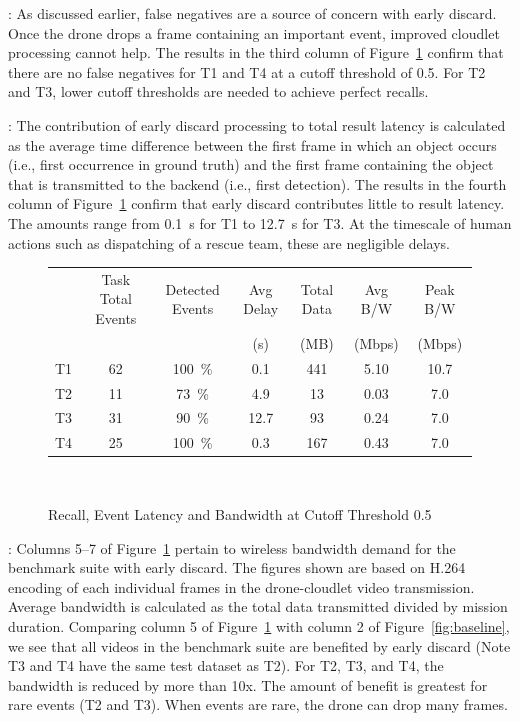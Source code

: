 : As discussed earlier, false negatives are
a source of concern with early discard.  Once the drone drops a frame
containing an important event, improved cloudlet processing cannot help. The
results in the third column of Figure~\ref{fig:early-discard-results} confirm
that there are no false negatives for T1 and T4 at a cutoff threshold of 0.5.
For T2 and T3, lower cutoff thresholds are needed to achieve perfect recalls.

:
The contribution of early discard processing to total result latency
is calculated as the average time difference between the first frame
in which an object occurs (i.e., first occurrence in ground truth) and
the first frame containing the object that is transmitted to the
backend (i.e., first detection).  The results in the fourth column of
Figure~\ref{fig:early-discard-results} confirm that early discard
contributes little to result latency.  The amounts range from 0.1~s
for T1 to 12.7~s for T3.  At the timescale of human actions
such as dispatching of a rescue team, these are negligible delays.

\begin{figure}
\centering
\begin{tabular}{|c|c|c|c|c|c|c|}
\hline
   &Task Total Events   &Detected Events       &Avg Delay & Total Data &Avg B/W &Peak B/W\\
   & & &(s)&(MB)&(Mbps)&(Mbps)\\ 

\hline
T1 & \phantom{0}62  & 100~\%       &  \phantom{0}0.1&\phantom{0}441  &  5.10     &   10.7  \\
\hline
T2 & \phantom{0}11  & \phantom{0}73~\%      & \phantom{0}4.9 & \phantom{00}13            &  0.03 & \phantom{0}7.0 \\ %
\hline
T3 & \phantom{0}31  & \phantom{0}90~\%  & 12.7 & \phantom{00}93  &  0.24 &  \phantom{0}7.0 \\ %
\hline
T4 & \phantom{0}25  & 100~\%       & \phantom{0}0.3 & \phantom{0}167  &  0.43 &  \phantom{0}7.0 \\
\hline
\end{tabular}\\
\caption{Recall, Event Latency and Bandwidth at Cutoff Threshold 0.5}
\label{fig:early-discard-results}
\end{figure}


: Columns 5--7 of
Figure~\ref{fig:early-discard-results} pertain to wireless bandwidth demand for
the benchmark suite with early discard.  The figures shown are based on H.264
encoding of each individual frames in the drone-cloudlet video transmission.
Average bandwidth is calculated as the total data transmitted divided by
mission duration.  Comparing column 5 of Figure~\ref{fig:early-discard-results}
with column 2 of Figure~\ref{fig:baseline}, we see that all videos in the
benchmark suite are benefited by early discard (Note T3 and T4 have the same
test dataset as T2). For T2, T3, and T4, the bandwidth is reduced by more than
10x. The amount of benefit is greatest for rare events (T2 and T3).  When
events are rare, the drone can drop many frames.


